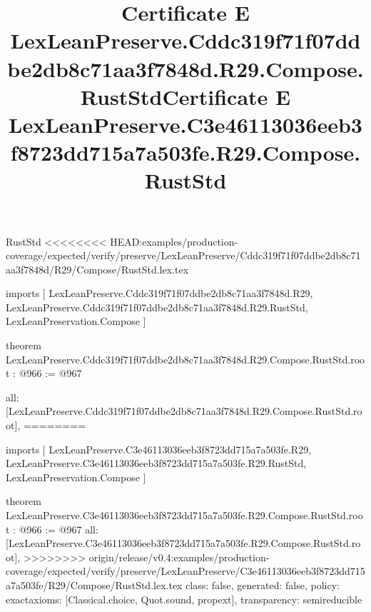 \begin{lexlean}{RustStd}
<<<<<<<< HEAD:examples/production-coverage/expected/verify/preserve/LexLeanPreserve/Cddc319f71f07ddbe2db8c71aa3f7848d/R29/Compose/RustStd.lex.tex
\title{Certificate E LexLeanPreserve.Cddc319f71f07ddbe2db8c71aa3f7848d.R29.Compose.RustStd}
\begin{coremodule}
imports [
  LexLeanPreserve.Cddc319f71f07ddbe2db8c71aa3f7848d.R29,
  LexLeanPreserve.Cddc319f71f07ddbe2db8c71aa3f7848d.R29.RustStd,
  LexLeanPreservation.Compose
]

theorem LexLeanPreserve.Cddc319f71f07ddbe2db8c71aa3f7848d.R29.Compose.RustStd.root : @966 := @967 {
  all: [LexLeanPreserve.Cddc319f71f07ddbe2db8c71aa3f7848d.R29.Compose.RustStd.root],
========
\title{Certificate E LexLeanPreserve.C3e46113036eeb3f8723dd715a7a503fe.R29.Compose.RustStd}
\begin{coremodule}
imports [
  LexLeanPreserve.C3e46113036eeb3f8723dd715a7a503fe.R29,
  LexLeanPreserve.C3e46113036eeb3f8723dd715a7a503fe.R29.RustStd,
  LexLeanPreservation.Compose
]

theorem LexLeanPreserve.C3e46113036eeb3f8723dd715a7a503fe.R29.Compose.RustStd.root : @966 := @967 {
  all: [LexLeanPreserve.C3e46113036eeb3f8723dd715a7a503fe.R29.Compose.RustStd.root],
>>>>>>>> origin/release/v0.4:examples/production-coverage/expected/verify/preserve/LexLeanPreserve/C3e46113036eeb3f8723dd715a7a503fe/R29/Compose/RustStd.lex.tex
  class: false,
  generated: false,
  policy: exact{axioms: [Classical.choice, Quot.sound, propext]},
  transparency: semireducible
}


\end{coremodule}}
\end{coremodule}
\end{lexlean}
